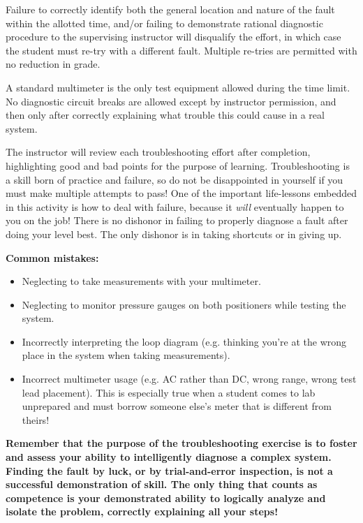\documentclass[12pt,a4paper]{article}
\begin{document}
\begin{itemize}
Failure to correctly identify both the general location and nature of the fault within the allotted time, and/or failing to demonstrate rational diagnostic procedure to the supervising instructor will disqualify the effort, in which case the student must re-try with a different fault.  Multiple re-tries are permitted with no reduction in grade.

A standard multimeter is the only test equipment allowed during the time limit.  No diagnostic circuit breaks are allowed except by instructor permission, and then only after correctly explaining what trouble this could cause in a real system.  

The instructor will review each troubleshooting effort after completion, highlighting good and bad points for the purpose of learning.  Troubleshooting is a skill born of practice and failure, so do not be disappointed in yourself if you must make multiple attempts to pass!  One of the important life-lessons embedded in this activity is how to deal with failure, because it {\it will} eventually happen to you on the job!  There is no dishonor in failing to properly diagnose a fault after doing your level best.  The only dishonor is in taking shortcuts or in giving up.

\vskip 10pt

{\bf Common mistakes:}

\begin{itemize}
\item{} Neglecting to take measurements with your multimeter.
\item{} Neglecting to monitor pressure gauges on both positioners while testing the system.
\item{} Incorrectly interpreting the loop diagram (e.g. thinking you're at the wrong place in the system when taking measurements).
\item{} Incorrect multimeter usage (e.g. AC rather than DC, wrong range, wrong test lead placement).  This is especially true when a student comes to lab unprepared and must borrow someone else's meter that is different from theirs!
\end{itemize}

\vskip 10pt

{\bf Remember that the purpose of the troubleshooting exercise is to foster and assess your ability to intelligently diagnose a complex system.  Finding the fault by luck, or by trial-and-error inspection, is not a successful demonstration of skill.  The only thing that counts as competence is your demonstrated ability to logically analyze and isolate the problem, correctly explaining all your steps!}


\end{itemize}
\end{document}
